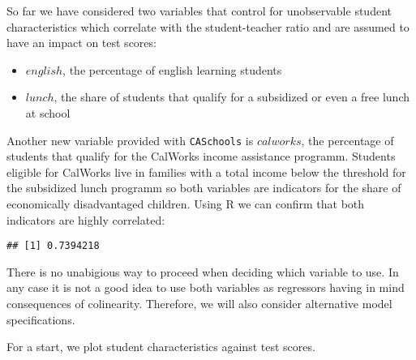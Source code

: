 \documentclass[]{book}
\newenvironment{Shaded}{\begin{snugshade}}{\end{snugshade}}
\newcommand{\KeywordTok}[1]{\textcolor[rgb]{0.13,0.29,0.53}{\textbf{#1}}}
\newcommand{\CommentTok}[1]{\textcolor[rgb]{0.56,0.35,0.01}{\textit{#1}}}
\newcommand{\OperatorTok}[1]{\textcolor[rgb]{0.81,0.36,0.00}{\textbf{#1}}}
\newcommand{\NormalTok}[1]{#1}
\theoremstyle{definition}
\theoremstyle{definition}
\theoremstyle{definition}
\theoremstyle{remark}
\begin{document}
So far we have considered two variables that control for unobservable
student characteristics which correlate with the student-teacher ratio
and are assumed to have an impact on test scores:

\begin{itemize}
\item
  \(english\), the percentage of english learning students
\item
  \(lunch\), the share of students that qualify for a subsidized or even
  a free lunch at school
\end{itemize}

Another new variable provided with \texttt{CASchools} is \(calworks\),
the percentage of students that qualify for the CalWorks income
assistance programm. Students eligible for CalWorks live in families
with a total income below the threshold for the subsidized lunch
programm so both variables are indicators for the share of economically
disadvantaged children. Using R we can confirm that both indicators are
highly correlated:

\begin{Shaded}
\end{Shaded}

\begin{verbatim}
## [1] 0.7394218
\end{verbatim}

There is no unabigious way to proceed when deciding which variable to
use. In any case it is not a good idea to use both variables as
regressors having in mind consequences of colinearity. Therefore, we
will also consider alternative model specifications.

For a start, we plot student characteristics against test scores.
\end{document}
